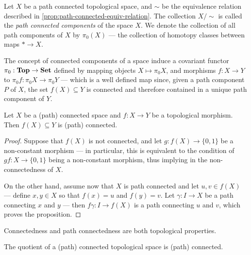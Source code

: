\begin{definition}
\label{def:path-connected-components}
Let \(X\) be a path connected topological space, and \(\sim\) be the equivalence
relation described in \cref{prop:path-connected-equiv-relation}. The collection
\(X/{\sim}\) is called the \emph{path connected components} of the space
\(X\). We denote the collection of all path components of \(X\) by \(\pi_0(X)\)
--- the collection of homotopy classes between maps \(* \to X\).
\end{definition}

\begin{definition}[\(\pi_0\) functor]
\label{def:pi0-functor}
The concept of connected components of a space induce a covariant functor
\(\pi_0: {\textbf{Top}} \to {\textbf{Set}}\) defined by mapping objects \(X \mapsto \pi_0 X\), and
morphisms \(f: X \to Y\) to \(\pi_0 f: \pi_0 X \to \pi_0 Y\) --- which is a well
defined map since, given a path component \(P\) of \(X\), the set \(f(X)
\subseteq Y\) is connected and therefore contained in a unique path component of
\(Y\).
\end{definition}

\begin{theorem}
\label{thm:morphisms-preserve-connectivity}
Let \(X\) be a (path) connected space and \(f: X \to Y\) be a topological
morphism. Then \(f(X) \subseteq Y\) is (path) connected.
\end{theorem}

\begin{proof}
Suppose that \(f(X)\) is not connected, and let \(g: f(X) \to \{0, 1\}\) be a
non-constant morphism --- in particular, this is equivalent to the condition of
\(gf: X \to \{0, 1\}\) being a non-constant morphism, thus implying in the
non-connectedness of \(X\).

On the other hand, assume now that \(X\) is path connected and let \(u, v \in
f(X)\) --- define \(x, y \in X\) so that \(f(x) = u\) and \(f(y) = v\). Let
\(\gamma: I \to X\) be a path connecting \(x\) and \(y\) --- then \(f\gamma: I
\to f(X)\) is a path connecting \(u\) and \(v\), which proves the proposition.
\end{proof}

\begin{corollary}
\label{cor:connectedness-top-property}
Connectedness and path connectedness are both topological properties.
\end{corollary}

\begin{corollary}
\label{cor:quotient-path-connected-is-path-connected}
The quotient of a (path) connected topological space is (path) connected.
\end{corollary}

